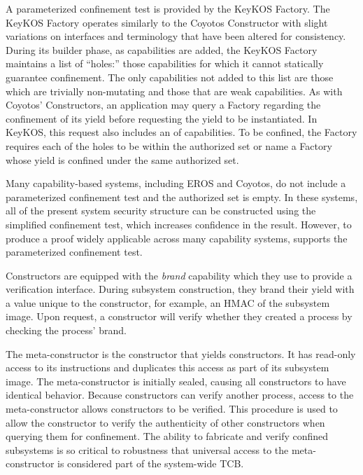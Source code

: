 A parameterized confinement test is provided by the KeyKOS Factory. \cite{Hardy:KeyKOS:Factory:Patent}
The KeyKOS Factory operates similarly to the Coyotos Constructor with slight variations on interfaces and terminology that have been altered for consistency.
During its builder phase, as capabilities are added, the KeyKOS Factory maintains a list of ``holes:'' those capabilities for which it cannot statically guarantee confinement.
The only capabilities not added to this list are those which are trivially non-mutating and those that are weak capabilities.
As with Coyotos' Constructors, an application may query a Factory regarding the confinement of its yield before requesting the yield to be instantiated.
In KeyKOS, this request also includes an  of capabilities.
To be confined, the Factory requires each of the holes to be within the authorized set or name a Factory whose yield is confined under the same authorized set.

Many capability-based systems, including EROS and Coyotos, do not include a parameterized confinement test and the authorized set is empty.
In these systems, all of the present system security structure can be constructed using the simplified confinement test, which increases confidence in the result.
However, to produce a proof widely applicable across many capability systems, \TMmodelName{} supports the parameterized confinement test.

Constructors are equipped with the \emph{brand} capability which they use to provide a verification interface.
During subsystem construction, they brand their yield with a value unique to the constructor, for example, an HMAC of the subsystem image.
Upon request, a constructor will verify whether they created a process by checking the process' brand.

The meta-constructor is the constructor that yields constructors.
It has read-only access to its instructions and duplicates this access as part of its subsystem image.
The meta-constructor is initially sealed, causing all constructors to have identical behavior.
Because constructors can verify another process, access to the meta-constructor allows constructors to be verified.
This procedure is used to allow the constructor to verify the authenticity of other constructors when querying them for confinement.
The ability to fabricate and verify confined subsystems is so critical to robustness that universal access to the meta-constructor is considered part of the system-wide TCB.

